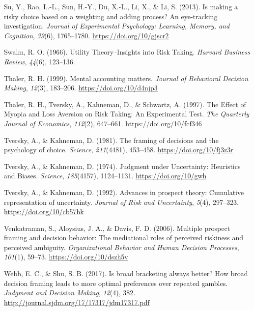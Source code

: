 \documentclass[
  english,
  man, donotrepeattitle,floatsintext]{apa7}
\newlength{\cslhangindent}
\newenvironment{cslreferences}%
  {\setlength{\parindent}{0pt}%
  \everypar{\setlength{\hangindent}{\cslhangindent}}\ignorespaces}%
  {\par}
\theoremstyle{definition}
\theoremstyle{definition}
\theoremstyle{definition}
\theoremstyle{definition}
\theoremstyle{remark}
\begin{document}
\begin{cslreferences}
\leavevmode\hypertarget{ref-su2013}{}%
Su, Y., Rao, L.-L., Sun, H.-Y., Du, X.-L., Li, X., \& Li, S. (2013). Is making a risky choice based on a weighting and adding process? An eye-tracking investigation. \emph{Journal of Experimental Psychology: Learning, Memory, and Cognition}, \emph{39}(6), 1765--1780. \url{https://doi.org/10/gjscr2}

\leavevmode\hypertarget{ref-swalm1966}{}%
Swalm, R. O. (1966). Utility Theory--Insights into Risk Taking. \emph{Harvard Business Review}, \emph{44}(6), 123--136.

\leavevmode\hypertarget{ref-thaler1999}{}%
Thaler, R. H. (1999). Mental accounting matters. \emph{Journal of Behavioral Decision Making}, \emph{12}(3), 183--206. \url{https://doi.org/10/d4njp3}

\leavevmode\hypertarget{ref-thaler1997}{}%
Thaler, R. H., Tversky, A., Kahneman, D., \& Schwartz, A. (1997). The Effect of Myopia and Loss Aversion on Risk Taking: An Experimental Test. \emph{The Quarterly Journal of Economics}, \emph{112}(2), 647--661. \url{https://doi.org/10/fcf346}

\leavevmode\hypertarget{ref-tversky1981}{}%
Tversky, A., \& Kahneman, D. (1981). The framing of decisions and the psychology of choice. \emph{Science}, \emph{211}(4481), 453--458. \url{https://doi.org/10/fj3z3r}

\leavevmode\hypertarget{ref-tversky1974}{}%
Tversky, A., \& Kahneman, D. (1974). Judgment under Uncertainty: Heuristics and Biases. \emph{Science}, \emph{185}(4157), 1124--1131. \url{https://doi.org/10/gwh}

\leavevmode\hypertarget{ref-tversky1992}{}%
Tversky, A., \& Kahneman, D. (1992). Advances in prospect theory: Cumulative representation of uncertainty. \emph{Journal of Risk and Uncertainty}, \emph{5}(4), 297--323. \url{https://doi.org/10/cb57hk}

\leavevmode\hypertarget{ref-venkatraman2006}{}%
Venkatraman, S., Aloysius, J. A., \& Davis, F. D. (2006). Multiple prospect framing and decision behavior: The mediational roles of perceived riskiness and perceived ambiguity. \emph{Organizational Behavior and Human Decision Processes}, \emph{101}(1), 59--73. \url{https://doi.org/10/dszh5v}

\leavevmode\hypertarget{ref-webb2017}{}%
Webb, E. C., \& Shu, S. B. (2017). Is broad bracketing always better? How broad decision framing leads to more optimal preferences over repeated gambles. \emph{Judgment and Decision Making}, \emph{12}(4), 382. \url{http://journal.sjdm.org/17/17317/jdm17317.pdf}


\end{cslreferences}
\end{document}
